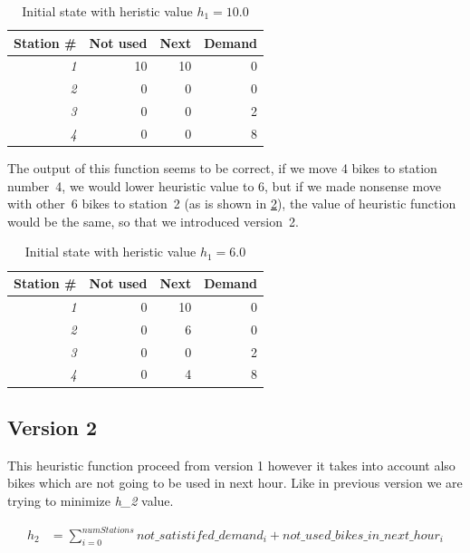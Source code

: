 \documentclass[11pt,twoside,a4paper]{mr}%
\begin{document}
\begin{table}[!t]
\renewcommand{\arraystretch}{1.1}
\label{t:ex1a}
\begin{center}
\begin{tabular}[t]{|r|r|r|r|}
\hline
\bf Station \# & \bf Not used & \bf Next &\bf Demand\\ \hline\hline
\sl1 & 10 & 10 & 0\\ \hline
\sl2 & 0 & 0 & 0\\ \hline
\sl3 & 0 & 0 & 2\\ \hline
\sl4 & 0 & 0 & 8\\ \hline
\end{tabular}
\end{center}

\caption{Initial state with heristic value \(h_1= 10.0\)}
\end{table}

The output of this function seems to be correct, if we move 4 bikes to station number~4, we would lower heuristic value to 6, but if we made nonsense move with other~6 bikes to station~2 (as is shown in \ref{t:ex1b}), the value of heuristic function would be the same, so that we introduced version~2.

 \begin{table}[!t]
\renewcommand{\arraystretch}{1.1}

\label{t:ex1b}
\begin{center}
\begin{tabular}[t]{|r|r|r|r|}
\hline
\bf Station \# & \bf Not used & \bf Next &\bf Demand\\ \hline\hline
\sl1 & 0 & 10 & 0\\ \hline
\sl2 & 0 & 6 & 0\\ \hline
\sl3 & 0 & 0 & 2\\ \hline
\sl4 & 0 & 4 & 8\\ \hline
\end{tabular}
\end{center}
\caption{Initial state with heristic value \(h_1= 6.0\)}
\end{table}

\subsection{Version 2}
This heuristic function proceed from version 1 however it takes into account also bikes which are not going to be used in next hour. Like in previous version we are trying to minimize \textsl{h\_2} value.

\begin{align}
 h_2 &=\sum\limits_{i=0}^{numStations} not\_satistifed\_demand_i + not\_used\_bikes\_in\_next\_hour_i
\end{align}
\end{document}
